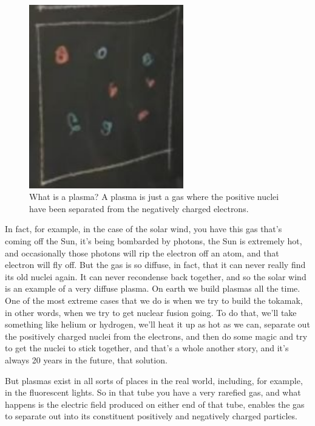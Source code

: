 \documentclass[]{article}
\begin{document}
\begin{figure}[H]
	\begin{center}
		\caption[What is a plasma?]{What is a plasma? A plasma is just a gas 	where the positive nuclei have been separated from the negatively charged electrons.}\label{fig:plasma-0}
		\includegraphics[width=0.6\textwidth]{plasma0}
	\end{center}
\end{figure}

In fact, for example, in the case of the solar wind, you have this gas
that's coming off the Sun, it's being bombarded by photons, the Sun is extremely hot,
and occasionally those photons will rip the electron off an atom, and that electron will fly off.
But the gas is so diffuse, in fact, that it can never really find its old nuclei again.
It can never recondense back together, and so the solar wind is an example of a very diffuse plasma.
On earth we build plasmas all the time.
One of the most extreme cases that we do is when we try to build the tokamak, in other words, when we try to get nuclear fusion going.
To do that, we'll take something like helium or hydrogen, we'll heat it up as hot as we can, separate out the positively charged nuclei from the electrons, and then do some magic and try to get the nuclei to stick together, and that's a whole another story, and it's always 20 years in the future, that solution.

But plasmas exist in all sorts of places in the real world, including, for example,
in the fluorescent lights.
So in that tube you have a very rarefied gas, and what happens is the electric field
produced on either end of that tube, enables the gas to separate out into its constituent positively and negatively charged particles.
\end{document}
